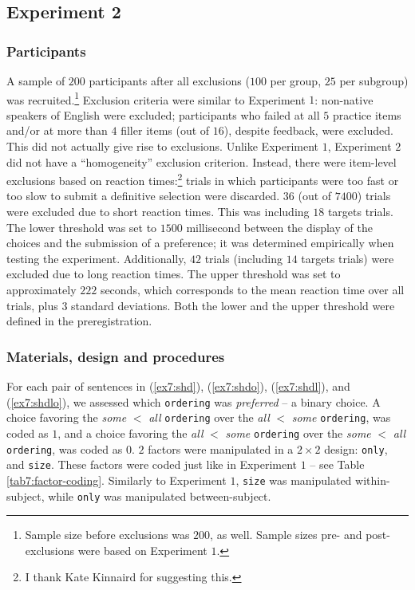 
\subsection{Experiment 2} 


\subsubsection{Participants}
A sample of $200$ participants after all exclusions ($100$ per group, $25$ per subgroup) was recruited.\footnote{Sample size before exclusions was $200$, as well. Sample sizes pre- and post-exclusions were based on Experiment $1$.} Exclusion criteria were similar to Experiment $1$: non-native speakers of English were excluded; participants who failed at all $5$ practice items and/or at more than $4$ filler items (out of $16$), despite feedback, were excluded. This did not actually give rise to exclusions. Unlike Experiment $1$, Experiment $2$ did not have a ``homogeneity'' exclusion criterion. Instead, there were item-level exclusions based on reaction times:\footnote{I thank Kate Kinnaird for suggesting this.} trials in which participants were too fast or too slow to submit a definitive selection were discarded. $36$ (out of $7400$) trials were excluded due to short reaction times. This was including $18$ targets trials. The lower threshold was set to $1500$ millisecond between the display of the choices and the submission of a preference; it was determined empirically when testing the experiment. Additionally, $42$ trials (including $14$ targets trials) were excluded due to long reaction times. The upper threshold was set to approximately $222$ seconds, which corresponds to the mean reaction time over all trials, plus $3$ standard deviations. Both the lower and the upper threshold were defined in the preregistration.

\subsubsection{Materials, design and procedures}

For each pair of sentences in (\ref{ex7:shd}), (\ref{ex7:shdo}), (\ref{ex7:shdl}), and (\ref{ex7:shdlo}), we assessed which \texttt{ordering} was \textit{preferred} -- a binary choice. A choice favoring the \textit{some} $<$ \textit{all} \texttt{ordering} over the \textit{all} $<$ \textit{some} \texttt{ordering}, was coded as $1$, and a choice favoring the \textit{all} $<$ \textit{some} \texttt{ordering} over the \textit{some} $<$ \textit{all} \texttt{ordering}, was coded as $0$. $2$ factors were manipulated in  a $2\times2$ design: \texttt{only}, and \texttt{size}. These factors were coded just like in Experiment $1$ -- see Table \ref{tab7:factor-coding}. Similarly to Experiment $1$, \texttt{size} was manipulated within-subject, while \texttt{only} was manipulated between-subject.\\

